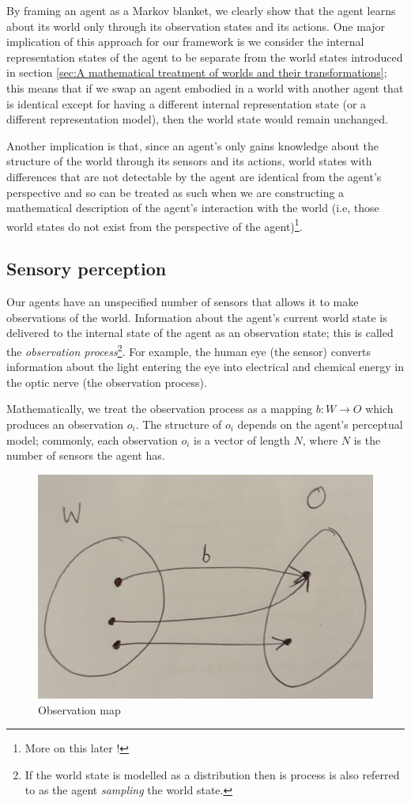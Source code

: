 By framing an agent as a Markov blanket, we clearly show that the agent learns about its world only through its observation states and its actions.
One major implication of this approach for our framework is we consider the internal representation states of the agent to be separate from the world states introduced in section \ref{sec:A mathematical treatment of worlds and their transformations}; this means that if we swap an agent embodied in a world with another agent that is identical except for having a different internal representation state (or a different representation model), then the world state would remain unchanged.

Another implication is that, since an agent's only gains knowledge about the structure of the world through its sensors and its actions, world states with differences that are not detectable by the agent are identical from the agent's perspective and so can be treated as such when we are constructing a mathematical description of the agent's interaction with the world (i.e, those world states do not exist from the perspective of the agent)\footnote{More on this later !}.

\subsection{Sensory perception}

Our agents have an unspecified number of sensors that allows it to make observations of the world.
Information about the agent's current world state is delivered to the internal state of the agent as an observation state; this is called the \emph{observation process}\footnote{If the world state is modelled as a distribution then is process is also referred to as the agent \emph{sampling} the world state.}.
For example, the human eye (the sensor) converts information about the light entering the eye into
electrical and chemical energy in the optic nerve (the observation process).

Mathematically, we treat the observation process as a mapping $b: W \to O$ which produces an observation $o_{i}$.
The structure of $o_{i}$ depends on the agent's perceptual model; commonly, each observation $o_{i}$ is a vector of length $N$, where $N$ is the number of sensors the agent has.

\begin{figure}
    \centering
    \includegraphics[width=0.5\linewidth]{2MathematicalFramework/InitialFramework/Images/observation_process_W_to_O.jpeg}
    \caption{
    Observation map
    }
    \label{fig:observation_process_W_to_O}
\end{figure}

